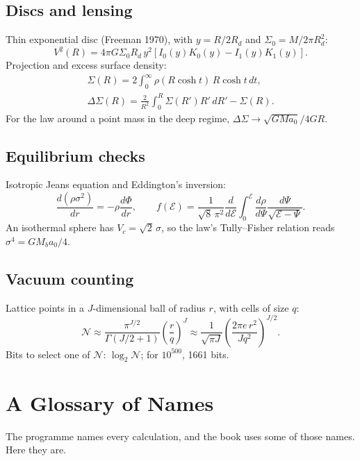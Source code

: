 \section{Discs and lensing}

Thin exponential disc (Freeman 1970), with $y=R/2R_d$ and $\Sigma_0=M/2\pi R_d^2$:
\[
V^2(R)=4\pi G\Sigma_0R_d\,y^2\left[I_0(y)K_0(y)-I_1(y)K_1(y)\right].
\]
Projection and excess surface density:
\begin{gather*}
\Sigma(R)=2\int_0^\infty\rho(R\cosh t)\,R\cosh t\,dt,\\
\Delta\Sigma(R)=\frac{2}{R^2}\int_0^R\Sigma(R')R'\,dR'-\Sigma(R).
\end{gather*}
For the law around a point mass in the deep regime, $\Delta\Sigma\to\sqrt{GMa_0}/4GR$.

\section{Equilibrium checks}

Isotropic Jeans equation and Eddington's inversion:
\[
\frac{d(\rho\sigma^2)}{dr}=-\rho\frac{d\Phi}{dr},\qquad f(\mathcal E)=\frac{1}{\sqrt8\,\pi^2}\frac{d}{d\mathcal E}\int_0^{\mathcal E}\frac{d\rho}{d\Psi}\frac{d\Psi}{\sqrt{\mathcal E-\Psi}}.
\]
An isothermal sphere has $V_c=\sqrt2\,\sigma$, so the law's Tully--Fisher relation reads $\sigma^4=GM_ba_0/4$.

\section{Vacuum counting}

Lattice points in a $J$-dimensional ball of radius $r$, with cells of size $q$:
\[
\mathcal N\approx\frac{\pi^{J/2}}{\Gamma(J/2+1)}\left(\frac rq\right)^J\approx\frac{1}{\sqrt{\pi J}}\left(\frac{2\pi e\,r^2}{Jq^2}\right)^{J/2}.
\]
Bits to select one of $\mathcal N$: $\log_2\mathcal N$; for $10^{500}$, 1661 bits.

\chapter{A Glossary of Names}

The programme names every calculation, and the book uses some of those names. Here they are.

